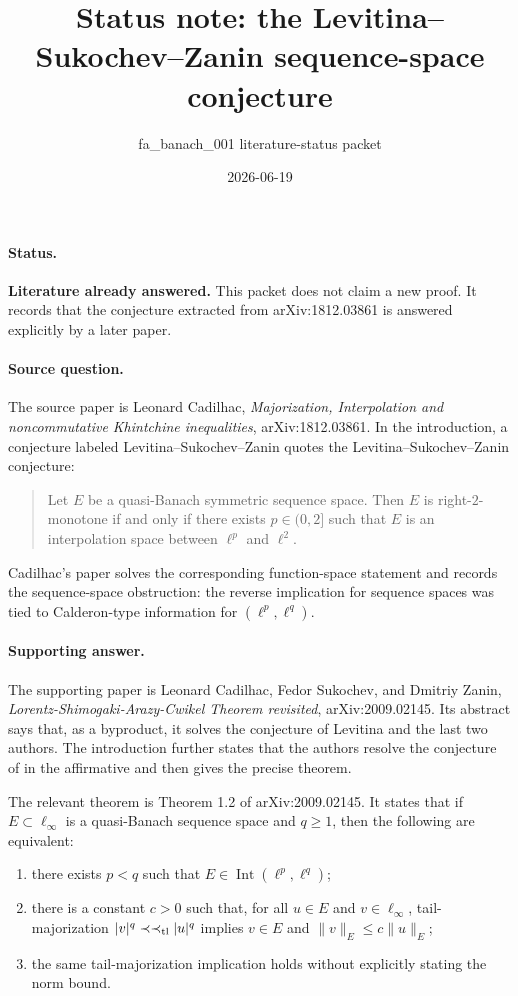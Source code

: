 \documentclass[11pt]{article}
\title{Status note: the Levitina--Sukochev--Zanin sequence-space conjecture}
\author{fa\_banach\_001 literature-status packet}
\date{2026-06-19}
\newcommand{\Int}{\operatorname{Int}}
\begin{document}
\maketitle

\paragraph{Status.}
\textbf{Literature already answered.}  This packet does not claim a new
proof.  It records that the conjecture extracted from arXiv:1812.03861 is
answered explicitly by a later paper.

\paragraph{Source question.}
The source paper is Leonard Cadilhac, \emph{Majorization, Interpolation and
noncommutative Khintchine inequalities}, arXiv:1812.03861.  In the
introduction, a conjecture labeled Levitina--Sukochev--Zanin quotes the
Levitina--Sukochev--Zanin conjecture:
\begin{quote}
Let \(E\) be a quasi-Banach symmetric sequence space.  Then \(E\) is
right-\(2\)-monotone if and only if there exists \(p\in(0,2]\) such that
\(E\) is an interpolation space between \(\ell^p\) and \(\ell^2\).
\end{quote}
Cadilhac's paper solves the corresponding function-space statement and
records the sequence-space obstruction: the reverse implication for
sequence spaces was tied to Calderon-type information for
\((\ell^p,\ell^q)\).

\paragraph{Supporting answer.}
The supporting paper is Leonard Cadilhac, Fedor Sukochev, and Dmitriy
Zanin, \emph{Lorentz-Shimogaki-Arazy-Cwikel Theorem revisited},
arXiv:2009.02145.  Its abstract says that, as a byproduct, it solves the
conjecture of Levitina and the last two authors.  The introduction further
states that the authors resolve the conjecture of \cite{LSZ} in the
affirmative and then gives the precise theorem.

The relevant theorem is Theorem 1.2 of arXiv:2009.02145.  It states that if
\(E\subset \ell_\infty\) is a quasi-Banach sequence space and \(q\ge 1\),
then the following are equivalent:
\begin{enumerate}
\item there exists \(p<q\) such that \(E\in \Int(\ell^p,\ell^q)\);
\item there is a constant \(c>0\) such that, for all \(u\in E\) and
      \(v\in \ell_\infty\), tail-majorization
      \(|v|^q \prec\prec_{\rm tl} |u|^q\) implies
      \(v\in E\) and \(\|v\|_E\le c\|u\|_E\);
\item the same tail-majorization implication holds without explicitly
      stating the norm bound.
\end{enumerate}
\end{document}
